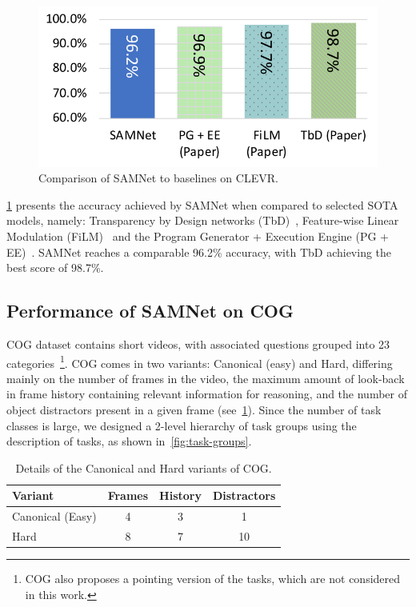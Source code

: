 \begin{figure}[htbp]
	\centering
	\includegraphics[width=0.8\columnwidth]{../img/plots/clevr_baselines.pdf}
	\caption{Comparison of SAMNet to baselines on CLEVR.}
	\label{fig:clevr_baselines}
\end{figure}

\cref{fig:clevr_baselines} presents the accuracy achieved by SAMNet when compared to selected SOTA models, namely: Transparency by Design networks (TbD)~\cite{mascharka2018transparency}, Feature-wise Linear Modulation (FiLM)~\cite{perez2018film} and the Program Generator + Execution Engine (PG + EE)~\cite{johnson2017inferring}.
SAMNet reaches a comparable 96.2\% accuracy, with TbD achieving the best score of 98.7\%.


\subsection{Performance of SAMNet on COG}
\label{sec:cog-baseline-compare}

COG dataset contains short videos, with associated questions grouped into 23 categories~\footnote{COG also proposes a pointing version of the tasks, which are not considered in this work.}.
COG comes in two variants: Canonical (easy) and Hard, differing mainly on the number of frames in the video, the maximum amount of look-back in frame history containing relevant information for reasoning, and the number of object distractors present in a given frame (see~\cref{tab:cog_variants}).
Since the number of task classes is large, we designed a 2-level hierarchy of task groups using the
description of tasks, as shown in~\cref{fig:task-groups}.

\begin{table}[ht]
	\centering
	\begin{tabular}{lccc}
		\toprule
		Variant	& Frames & History	& Distractors \\
		\midrule
		Canonical (Easy) & 4 & 3 & 1\\
		Hard  & 8 & 7 & 10\\
		\bottomrule
	\end{tabular}
	\caption{Details of the Canonical and Hard variants of COG.}
	\label{tab:cog_variants}
\end{table}



